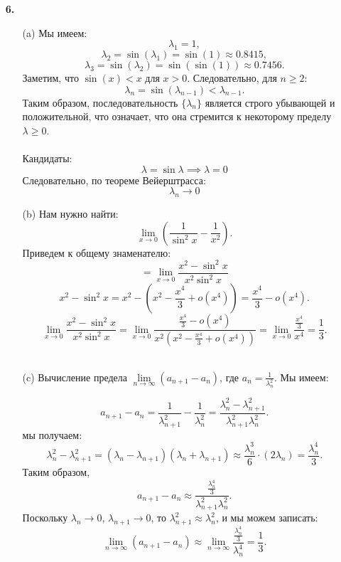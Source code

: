 \documentclass[a4paper]{article}
\newcommand{\lm}[1]{\underset{#1}{\lim}}
\renewcommand{\geq}{\geqslant}
\begin{document}
\begin{enumerate}
    \item[\textbf{6.}]
    \begin{enumerate}
        \item[(a)]
        Мы имеем:
        $$
        \lambda_1 = 1,
        $$
        $$
        \lambda_2 = \sin(\lambda_1) = \sin(1) \approx 0.8415,
        $$
        $$
        \lambda_3 = \sin(\lambda_2) = \sin(\sin(1)) \approx 0.7456.
        $$
        Заметим, что $\sin(x) < x$ для $x > 0$. Следовательно, для $n \geq 2$:
        $$
        \lambda_n = \sin(\lambda_{n-1}) < \lambda_{n-1}.
        $$
        Таким образом, последовательность $\{\lambda_n\}$ является строго убывающей и положительной, что означает, что она стремится к некоторому пределу $\lambda \geq 0$. \\
        \\Кандидаты:
        $$\lambda = \sin{\lambda} \implies \lambda = 0$$
        Следовательно, по теореме Вейерштрасса:
        $$\lambda_n \to 0$$
        
        \item[(b)]
        Нам нужно найти:
        $$
        \lim_{x \to 0} \left(\frac{1}{\sin^2 x} - \frac{1}{x^2}\right).
        $$
        Приведем к общему знаменателю:
        $$
        = \lim_{x \to 0} \frac{x^2 - \sin^2 x}{x^2 \sin^2 x} 
        $$
        $$
        x^2 - \sin^2 x = x^2 - \left(x^2 - \frac{x^4}{3} + o(x^4)\right) = \frac{x^4}{3} - o(x^4).
        $$
        $$
        \lim_{x \to 0} \frac{x^2 - \sin^2 x}{x^2 \sin^2 x} = \lim_{x \to 0} \frac{\frac{x^4}{3} - o(x^4)}{x^2 \left(x^2 - \frac{x^4}{3} + o(x^4)\right)} = \lim_{x \to 0} \frac{\frac{x^4}{3}}{x^4} = \frac{1}{3}.
        $$\\

        \item[(c)]
        Вычисление предела $\lm{n \to \infty} (a_{n+1} - a_n)$, где $a_n = \frac{1}{\lambda_n^2}$. Мы имеем:

        $$
        a_{n+1} - a_n = \frac{1}{\lambda_{n+1}^2} - \frac{1}{\lambda_n^2} = \frac{\lambda_n^2 - \lambda_{n+1}^2}{\lambda_{n+1}^2 \lambda_n^2}.
        $$
        мы получаем:
        $$
        \lambda_n^2 - \lambda_{n+1}^2 = (\lambda_n - \lambda_{n+1})(\lambda_n + \lambda_{n+1}) \approx \frac{\lambda_n^3}{6} \cdot (2\lambda_n) = \frac{\lambda_n^4}{3}.
        $$
        Таким образом,
        $$
        a_{n+1} - a_n \approx \frac{\frac{\lambda_n^4}{3}}{\lambda_{n+1}^2 \lambda_n^2}.
        $$
        Поскольку $\lambda_n \to 0$, $\lambda_{n+1} \to 0$, то $\lambda_{n+1}^2 \approx \lambda_n^2$, и мы можем записать:
        $$
        \lim_{n \to \infty} (a_{n+1} - a_n) \approx \lim_{n \to \infty} \frac{\frac{\lambda_n^4}{3}}{\lambda_n^4} = \frac{1}{3}.
        $$


\end{enumerate}
\end{enumerate}
\end{document}
